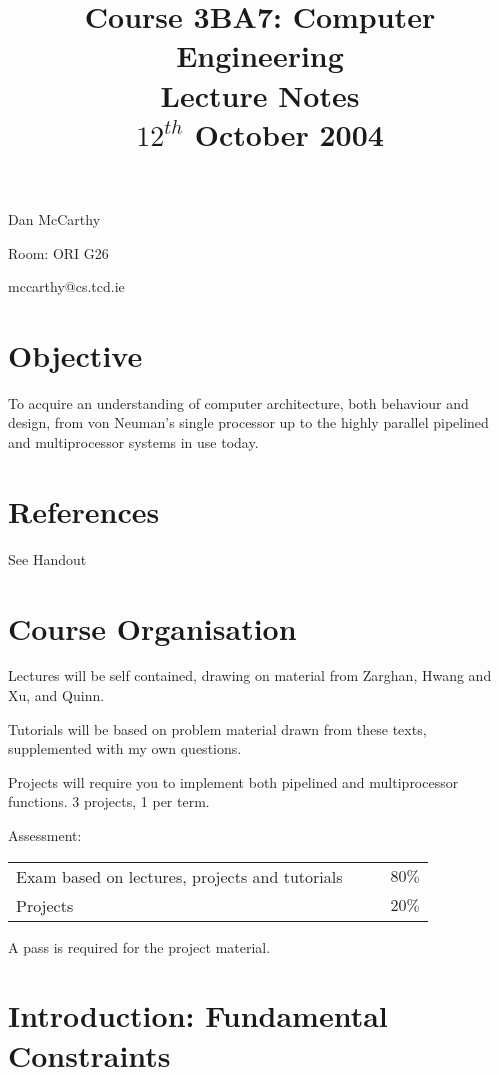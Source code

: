 \documentclass[a4paper,12pt]{article}
\begin{document}
\title{Course 3BA7: Computer Engineering \\ Lecture Notes \\ $12^{th}$ October 2004}

\maketitle

Dan McCarthy

Room: ORI G26

mccarthy@cs.tcd.ie

\section*{Objective}

To acquire an understanding of computer architecture, both behaviour and
design, from von Neuman's single processor up to the highly parallel
pipelined and multiprocessor systems in use today.

\section*{References}

See Handout

\section*{Course Organisation}

Lectures will be self contained, drawing on material from Zarghan, Hwang
and Xu, and Quinn.

Tutorials will be based on problem material drawn from these texts,
supplemented with my own questions.

Projects will require you to implement both pipelined and multiprocessor
functions. 3 projects, 1 per term.

Assessment:

\begin{tabular}{lccr}
Exam based on lectures, projects and tutorials	&	&	&	$80\%$	\\
Projects													 	&	&	&	$20\%$	
\end{tabular}

A pass is required for the project material.

\section*{Introduction: Fundamental Constraints}
\end{document}
